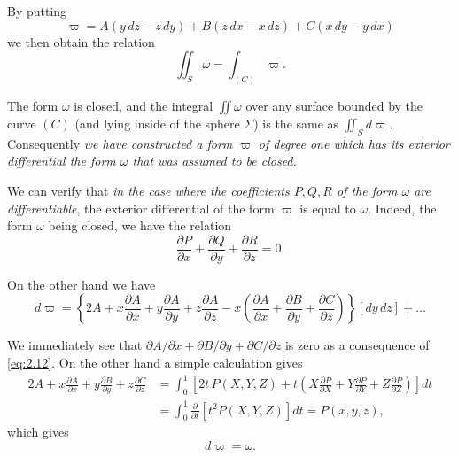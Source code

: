 \documentclass[leqno,11pt]{book}
\numberwithin{equation}{chapter}
\newcommand{\pd}{\partial}
\theoremstyle{shape1}
\theoremstyle{shape0}
\theoremstyle{shape2}
\theoremstyle{definition}
\begin{document}
By putting
\begin{equation}
  \label{eq:2.11}
  \varpi=A(y\,dz-z\,dy)+B(z\,dx-x\,dz)+C(x\,dy-y\,dx)
\end{equation}
we then obtain the relation
\[
\iint_{S}\omega=\int_{(C)}\varpi.
\]

The form $\omega$ is closed, and the integral $\iint\omega$ over any surface bounded by the curve $(C)$ (and lying inside of the sphere $\Sigma$) is the same as $\iint_{S}d\varpi$. Consequently \emph{we have constructed a form $\varpi$ of degree one which has its exterior differential the form $\omega$ that was assumed to be closed.}

\vspace{12pt}\fsec We can verify that \emph{in the case where the coefficients $P,Q,R$ of the form $\omega$ are differentiable}, the exterior differential of the form $\varpi$ is equal to $\omega$. Indeed, the form $\omega$ being closed, we have the relation
\begin{equation}
  \label{eq:2.12}
  \frac{\pd P}{\pd x}+\frac{\pd Q}{\pd y}+\frac{\pd R}{\pd z}=0.
\end{equation}

On the other hand we have
\[
d\varpi=\left\{ 2A+x\frac{\pd A}{\pd x}+y\frac{\pd A}{\pd y}+z\frac{\pd A}{\pd z}-x\left(\frac{\pd A}{\pd x}+\frac{\pd B}{\pd y}+\frac{\pd C}{\pd z}\right) \right\}[dy\,dz]+\dots
\]

We immediately see that $\pd A/\pd x+\pd B/\pd y+\pd C/\pd z$ is zero as a consequence of \eqref{eq:2.12}. On the other hand a simple calculation gives
\begin{align*}
  2A+x\frac{\pd A}{\pd x}+y\frac{\pd B}{\pd y}+z\frac{\pd C}{\pd z}&=\int_{0}^{1}\left[2t\,P(X,Y,Z)+t\left(X\frac{\pd P}{\pd X}+Y\frac{\pd P}{\pd Y}+Z\frac{\pd P}{\pd Z}\right)\right]dt\\
  &=\int_{0}^{1}\frac{\pd}{\pd t}[t^{2}P(X,Y,Z)]dt=P(x,y,z),
\end{align*}
which gives
\[
d\varpi=\omega.
\]

\vspace{12pt}\addtocounter{frenchsec}{1}
\end{document}
